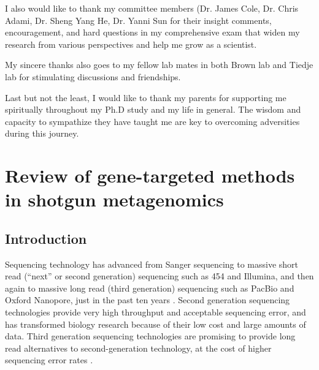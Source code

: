 \documentclass[]{msu-thesis}
\begin{document}
I also would like to thank my committee members (Dr. James Cole, Dr. Chris
Adami, Dr. Sheng Yang He, Dr. Yanni Sun for their insight comments,
encouragement, and hard questions in my comprehensive exam that widen my
research from various perspectives and help me grow as a scientist.

My sincere thanks also goes to my fellow lab mates in both Brown lab and Tiedje
lab for stimulating discussions and friendships.

Last but not the least, I would like to thank my parents for supporting me
spiritually throughout my Ph.D study and my life in general. The wisdom and
capacity to sympathize they have taught me are key to overcoming
adversities during this journey.
%
\clearpage
\SingleSpacing
\tableofcontents* %
\clearpage
\listoftables %
\clearpage
\listoffigures %
%
%
\mainmatter
%

\chapter{Review of gene-targeted methods in shotgun metagenomics}

\section{Introduction}

Sequencing technology has advanced from Sanger sequencing to massive
short read (``next'' or second generation) sequencing such as 454 and
Illumina, and then again to massive long read (third generation) sequencing such
as PacBio and Oxford Nanopore, just in the past ten years
\cite{mardis_impact_2008,pettersson_generations_2009}. Second
generation sequencing technologies provide very high throughput and
acceptable sequencing error, and has transformed biology
research because of their low cost and large amounts of data. Third generation sequencing technologies are
promising to provide long read alternatives to second-generation technology, at the cost of higher
sequencing error rates \cite{rhoads_pacbio_2015}.
\end{document}
